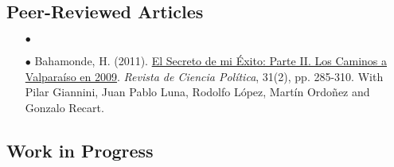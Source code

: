 \subsection*{Peer-Reviewed Articles}


\begin{itemize}

	\item[$\bullet$] \unskip

	\item[$\bullet$] Bahamonde, H. (2011). \href{https://scielo.conicyt.cl/pdf/revcipol/v31n2/art07.pdf}{El Secreto de mi \'Exito: Parte II. Los Caminos a Valpara\'iso en 2009}. \emph{Revista de Ciencia Pol\'itica}, 31(2), pp. 285-310. With Pilar Giannini, Juan Pablo Luna, Rodolfo L\'opez, Mart\'in Ordo\~nez and Gonzalo Recart.
  
\end{itemize}



\subsection*{Work in Progress}


